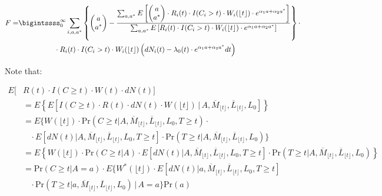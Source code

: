 \documentclass[AMA,STIX1COL]{WileyNJD-v2}
\newcommand{\pr}{\text{Pr}}
\begin{document}
\begingroup
\fontsize{10pt}{10pt}\selectfont
 \begin{align*}
F = &\bigintssss_0^\infty \sum_{i, a, a^*}\left\{\begin{pmatrix} a \\ a^* \end{pmatrix} - \frac{\sum_{a,a^*}E\left[\begin{pmatrix} a \\ a^* \end{pmatrix}\cdot R_i(t)\cdot I(C_i>t)\cdot W_i(\lfloor t \rfloor )\cdot e^{\alpha_1a + \alpha_2a^*}\right]}
{\sum_{a,a^*} E\left[R_i(t)\cdot I(C_i>t)\cdot W_i(\lfloor t \rfloor )\cdot e^{\alpha_1a + \alpha_2a^*}\right]}\right\}\cdot \\
&\,\,\,\,\,\,\,\,\,\,\,\,\,\,\,\,\,\,\,\,\,\,\,\,\,\,\,\,\,\,\cdot R_i(t)\cdot I(C_i>t)\cdot W_i(\lfloor t \rfloor )\left(dN_i(t) - \lambda_0(t)\cdot e^{\alpha_1a + \alpha_2a^*}dt\right)
\end{align*}
\endgroup

Note that:

\begingroup
\fontsize{10pt}{10pt}\selectfont
\begin{align*}
E[&R(t)\cdot I(C\ge t) \cdot W(t)\cdot dN(t)] \\
 &= E \left\{ E\left[I(C\ge t)\cdot R(t) \cdot dN(t) \cdot W(\lfloor t \rfloor) \,\bigg\rvert\, A,\overline{M}_{\lfloor t\rfloor }, \overline{L}_{\lfloor t\rfloor }, L_{0} \right]\right\}\\
&= E \bigg\{ W(\lfloor t \rfloor)\cdot \pr(C\ge t|A,\overline{M}_{\lfloor t\rfloor }, \overline{L}_{\lfloor t\rfloor }, L_0, T\ge t) \cdot \\
&~~~~\cdot E[dN(t)|A,\overline{M}_{\lfloor t\rfloor }, \overline{L}_{\lfloor t\rfloor}, L_0, T\ge t]
\cdot \pr(T\ge t|A,\overline{M}_{\lfloor t\rfloor }, \overline{L}_{\lfloor t\rfloor }, L_0)\bigg\}\\
&= E \left\{ W(\lfloor t \rfloor)\cdot \pr(C\ge t|A)
\cdot E[dN(t)|A,\overline{M}_{\lfloor t\rfloor }, \overline{L}_{\lfloor t\rfloor}, L_0, T\ge t]
\cdot \pr(T\ge t|A,\overline{M}_{\lfloor t\rfloor }, \overline{L}_{\lfloor t\rfloor }, L_0)\right\}\\
&= \pr(C\ge t|A=a)\cdot E \bigg\{ W^*(\lfloor t \rfloor)
\cdot E[dN(t)|a,\overline{M}_{\lfloor t\rfloor }, \overline{L}_{\lfloor t\rfloor}, L_0, T\ge t]\\
&~~~~\cdot \pr(T\ge t|a,\overline{M}_{\lfloor t\rfloor }, \overline{L}_{\lfloor t\rfloor }, L_0) \,\bigg\rvert\,A=a\bigg\}\pr(a)
\end{align*}
\endgroup
\end{document}
